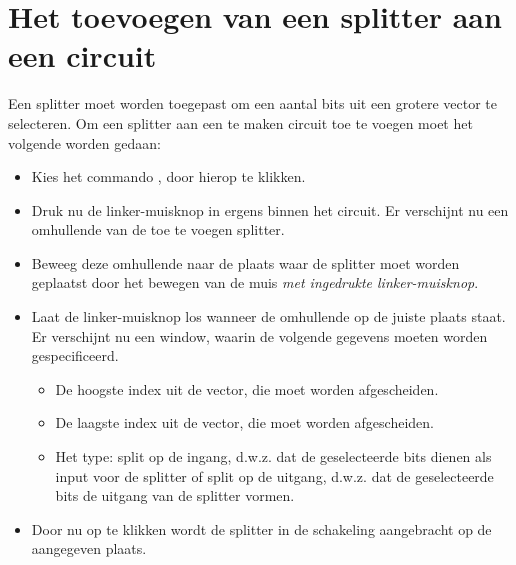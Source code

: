 \section{Het toevoegen van een splitter aan een circuit}
Een splitter moet worden toegepast om een aantal bits uit een grotere
vector te selecteren.
Om een splitter aan een te maken circuit toe te voegen moet het volgende
worden gedaan:
\begin{itemize}
\item Kies het commando , door hierop te klikken.
\item Druk nu de linker-muisknop in ergens binnen het circuit. Er verschijnt
      nu een omhullende van de toe te voegen splitter.
\item Beweeg deze omhullende naar de plaats waar de splitter moet worden
      geplaatst door het bewegen van de muis {\it met ingedrukte linker-muisknop}.
\item Laat de linker-muisknop los wanneer de omhullende op de juiste plaats staat.
      Er verschijnt nu een window, waarin de volgende gegevens moeten
      worden gespecificeerd.
      \begin{itemize}
      \item De hoogste index uit de vector, die moet worden afgescheiden.
      \item De laagste index uit de vector, die moet worden afgescheiden.
      \item Het type: split op de ingang, d.w.z. dat de geselecteerde bits
            dienen als input voor de splitter of split op de uitgang, d.w.z.
            dat de geselecteerde bits de uitgang van de splitter vormen.
      \end{itemize}
\item Door nu op  te klikken wordt de splitter in de schakeling
      aangebracht op de aangegeven plaats.
\end{itemize}

